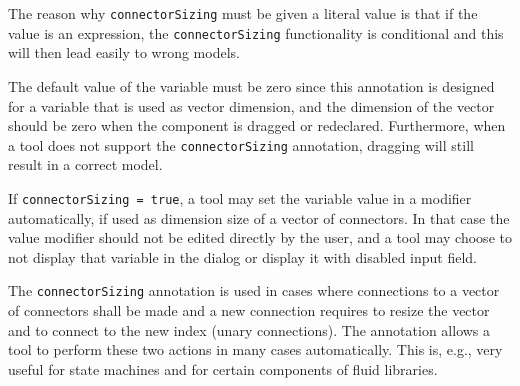 \begin{nonnormative}
The reason why \lstinline!connectorSizing! must be given a literal value is that if the value is an expression, the \lstinline!connectorSizing! functionality is conditional and this will then lead easily to wrong models.

The default value of the variable must be zero since this annotation is designed for a variable that is used as vector dimension, and the dimension of the vector should be zero when the component is dragged or redeclared.
Furthermore, when a tool does not support the \lstinline!connectorSizing! annotation, dragging will still result in a correct model.
\end{nonnormative}

If \lstinline!connectorSizing = true!, a tool may set the variable value in a modifier automatically, if used as dimension size of a vector of connectors.
In that case the value modifier should not be edited directly by the user, and a tool may choose to not display that variable in the dialog or display it with disabled input field.

\begin{nonnormative}
The \lstinline!connectorSizing! annotation is used in cases where connections to a vector of connectors shall be made and a new connection requires to resize the vector and to connect to the new index (unary connections).
The annotation allows a tool to perform these two actions in many cases automatically.
This is, e.g., very useful for state machines and for certain components of fluid libraries.
\end{nonnormative}

